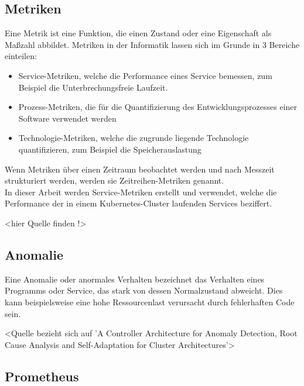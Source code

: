 \documentclass[a4paper,10pt]{scrartcl}
\begin{document}
\subsection{Metriken}

Eine Metrik ist eine Funktion, die einen Zustand oder eine Eigenschaft als Maßzahl
abbildet. Metriken in der Informatik lassen sich im Grunde in 3 Bereiche einteilen:
\begin{itemize}
\item Service-Metriken, welche die Performance eines Service bemessen, zum Beispiel die
Unterbrechungsfreie Laufzeit.
\item Prozess-Metriken, die für die Quantifizierung des Entwicklungsprozesses einer Software verwendet werden
\item Technologie-Metriken, welche die zugrunde liegende Technologie quantifizieren, zum
Beispiel die Speicherauslastung
\end{itemize}

Wenn Metriken über einen Zeitraum beobachtet werden und nach Messzeit strukturiert werden, werden sie Zeitreihen-Metriken genannt.\\
In dieser Arbeit werden Service-Metriken erstellt und verwendet, welche die Performance der in einem Kubernetes-Cluster laufenden Services beziffert.

<hier Quelle finden !>

\subsection{Anomalie}

Eine Anomalie oder anormales Verhalten bezeichnet das Verhalten eines Programms oder Service, das stark von dessen Normalzustand abweicht. Dies kann beispielsweise eine hohe Ressourcenlast verursacht durch fehlerhaften Code sein.

<Quelle bezieht sich auf 'A Controller Architecture for Anomaly Detection, Root Cause Analysis and Self-Adaptation for Cluster Architectures'>

\subsection{Prometheus}
\end{document}
